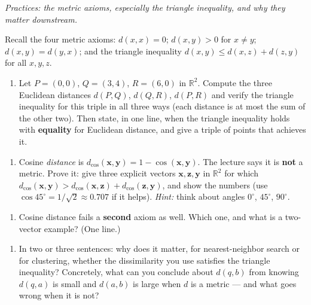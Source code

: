 \documentclass[
  11pt,
]{article}
\providecommand{\tightlist}{%
  \setlength{\itemsep}{0pt}\setlength{\parskip}{0pt}}
\begin{document}
\emph{Practices: the metric axioms, especially the triangle inequality,
and why they matter downstream.}

Recall the four metric axioms: \(d(x,x)=0\); \(d(x,y)>0\) for
\(x\ne y\); \(d(x,y)=d(y,x)\); and the triangle inequality
\(d(x,y)\le d(x,z)+d(z,y)\) for all \(x,y,z\).

\begin{enumerate}
\def\labelenumi{(\alph{enumi})}
\tightlist
\item
  Let \(P=(0,0)\), \(Q=(3,4)\), \(R=(6,0)\) in \(\mathbb{R}^2\). Compute
  the three Euclidean distances \(d(P,Q)\), \(d(Q,R)\), \(d(P,R)\) and
  verify the triangle inequality for this triple in all three ways (each
  distance is at most the sum of the other two). Then state, in one
  line, when the triangle inequality holds with \textbf{equality} for
  Euclidean distance, and give a triple of points that achieves it.
\end{enumerate}

\begin{enumerate}
\def\labelenumi{(\alph{enumi})}
\setcounter{enumi}{1}
\tightlist
\item
  Cosine \emph{distance} is
  \(d_{\cos}(\mathbf{x},\mathbf{y}) = 1 - \cos(\mathbf{x},\mathbf{y})\).
  The lecture says it is \textbf{not} a metric. Prove it: give three
  explicit vectors \(\mathbf{x},\mathbf{z},\mathbf{y}\) in
  \(\mathbb{R}^2\) for which
  \(d_{\cos}(\mathbf{x},\mathbf{y}) > d_{\cos}(\mathbf{x},\mathbf{z}) + d_{\cos}(\mathbf{z},\mathbf{y})\),
  and show the numbers (use \(\cos 45^\circ = 1/\sqrt2 \approx 0.707\)
  if it helps). \emph{Hint:} think about angles \(0^\circ\),
  \(45^\circ\), \(90^\circ\).
\end{enumerate}

\begin{enumerate}
\def\labelenumi{(\alph{enumi})}
\setcounter{enumi}{2}
\tightlist
\item
  Cosine distance fails a \textbf{second} axiom as well. Which one, and
  what is a two-vector example? (One line.)
\end{enumerate}

\begin{enumerate}
\def\labelenumi{(\alph{enumi})}
\setcounter{enumi}{3}
\tightlist
\item
  In two or three sentences: why does it matter, for nearest-neighbor
  search or for clustering, whether the dissimilarity you use satisfies
  the triangle inequality? Concretely, what can you conclude about
  \(d(q,b)\) from knowing \(d(q,a)\) is small and \(d(a,b)\) is large
  when \(d\) is a metric --- and what goes wrong when it is not?
\end{enumerate}
\end{document}
